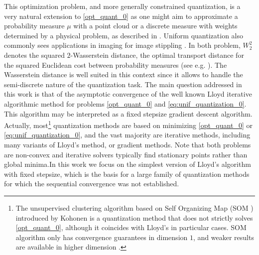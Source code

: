 \documentclass[11pt]{article}
\newcommand{\1}{\mathbbm{1}}
\numberwithin{equation}{section}
\begin{document}
This optimization problem, and more generally constrained quantization, is a very natural extension to \eqref{opt_quant_0} as one might aim to approximate a probability measure $\mu$ with a point cloud or a discrete measure with weights determined by a physical problem, as described in \cite{Bournehexagonalpatterns}. Uniform quantization also commonly sees applications in imaging for image stippling \cite{LebratGournay2D,balzer2009capacity}. In both problem, $W_2^2$ denotes the squared $2$-Wasserstein distance, the optimal transport distance for the squared Euclidean cost between probability measures (see e.g. \cite{refvillanitopics, villanioptoldnew, booksantambrogio}). The Wasserstein distance is well suited in this context since it allows to handle the semi-discrete nature of the quantization task. The main question addressed in this work is that of the asymptotic convergence of the well known Lloyd iterative algorithmic method for problems \eqref{opt_quant_0} and \eqref{eq:unif_quantization_0}. This algorithm may be interpreted as a fixed stepsize gradient descent algorithm. Actually, most\footnote{The unsupervised clustering algorithm based on Self Organizing Map (SOM \cite{cottrell2018self,asan2012introduction}) introduced by Kohonen \cite{kohonen1991self} is a quantization method that does not strictly solves \eqref{opt_quant_0}, although it coincides with Lloyd's in particular cases. SOM algorithm only has convergence guarantees in dimension $1$,  and weaker results are available in higher dimension \cite{cottrell2018self}.
} quantization methods are based on minimizing \eqref{opt_quant_0} or \eqref{eq:unif_quantization_0}, and the vast majority are iterative methods, including many variants of Lloyd's method, or gradient methods. Note that both problems are non-convex and iterative solvers typically find stationary points rather than global minima.In this work we focus on the simplest version of Lloyd's algorithm with fixed stepsize, which is the basis for a large family of quantization methods for which the sequential convergence was not established.
\end{document}
